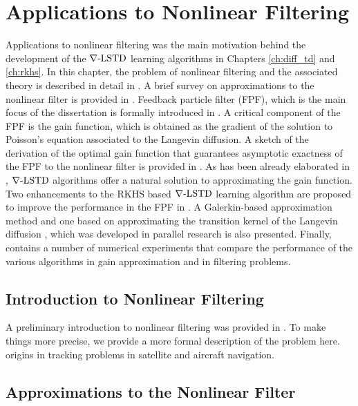 \chapter{Applications to Nonlinear Filtering} 
\label{ch:filtering}
Applications to nonlinear filtering was the main motivation behind the development of the $\nabla\text{-LSTD}$ learning algorithms in Chapters \ref{ch:diff_td} and \ref{ch:rkhs}. In this chapter, the problem of nonlinear filtering and the associated theory is described in detail in . A brief survey on approximations to the nonlinear filter is provided in . Feedback particle filter (FPF), which is the main focus of the dissertation is formally introduced in . A critical component of the FPF is the gain function, which is obtained as the gradient of the solution to Poisson's equation associated to the Langevin diffusion. A sketch of the derivation of the optimal gain function that guarantees asymptotic exactness of the FPF to the nonlinear filter is provided in . As has been already elaborated in , $\nabla\text{-LSTD}$ algorithms offer a natural solution to approximating the gain function. Two enhancements to the RKHS based $\nabla\text{-LSTD}$ learning algorithm are proposed to improve the performance in the FPF in . A Galerkin-based approximation method and one based on approximating the transition kernel of the Langevin diffusion \cite{tagmeh16a}, which was developed in parallel research is also presented. Finally,  contains a number of numerical experiments that compare the performance of the various algorithms in gain approximation and in filtering problems.  

\section{Introduction to Nonlinear Filtering} 
\label{s:nl_filtering_intro}
A preliminary introduction to nonlinear filtering was provided in . To make things more precise, we provide a more formal description of the problem here. 
origins in tracking problems in satellite and aircraft navigation. 
\cite{kutsurpfi19}

\section{Approximations to the Nonlinear Filter}
\label{s:approx_nl_filter}

